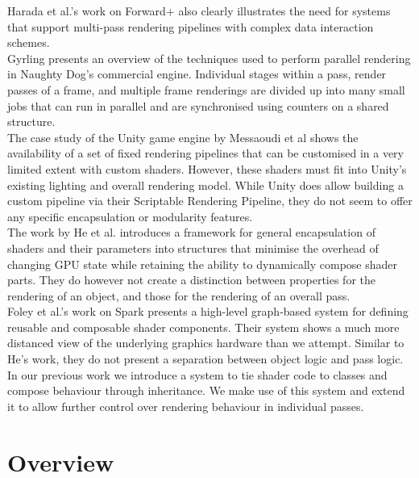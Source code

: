 \documentclass[format=sigconf]{acmart}
\begin{document}
Harada et al.'s work on Forward+\cite{forward+}\cite{forward+talk} also clearly illustrates the need for systems that support multi-pass rendering pipelines with complex data interaction schemes. \\

Gyrling\cite{fibers} presents an overview of the techniques used to perform parallel rendering in Naughty Dog's commercial engine. Individual stages within a pass, render passes of a frame, and multiple frame renderings are divided up into many small jobs that can run in parallel and are synchronised using counters on a shared structure. \\

The case study of the Unity game engine by Messaoudi et al\cite{unity} shows the availability of a set of fixed rendering pipelines that can be customised in a very limited extent with custom shaders. However, these shaders must fit into Unity's existing lighting and overall rendering model. While Unity does allow building a custom pipeline via their Scriptable Rendering Pipeline\cite{unitycustom}, they do not seem to offer any specific encapsulation or modularity features. \\

The work by He et al.\cite{components} introduces a framework for general encapsulation of shaders and their parameters into structures that minimise the overhead of changing GPU state while retaining the ability to dynamically compose shader parts. They do however not create a distinction between properties for the rendering of an object, and those for the rendering of an overall pass. \\

Foley et al.'s work on Spark\cite{spark} presents a high-level graph-based system for defining reusable and composable shader components. Their system shows a much more distanced view of the underlying graphics hardware than we attempt. Similar to He's work, they do not present a separation between object logic and pass logic. \\

In our previous work\cite{glsloop} we introduce a system to tie shader code to classes and compose behaviour through inheritance. We make use of this system and extend it to allow further control over rendering behaviour in individual passes.

\section{Overview}\label{overview}
\end{document}

